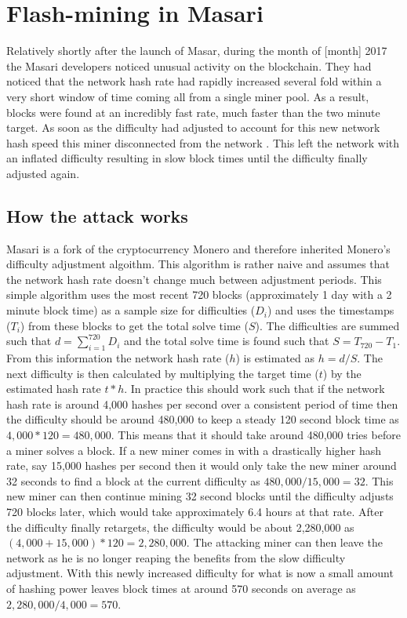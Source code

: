\documentclass{article}
\begin{document}
\section{Flash-mining in Masari}
Relatively shortly after the launch of Masar, during the month of [month] 2017 the Masari developers noticed unusual activity on the blockchain. They had noticed that the network hash rate had rapidly increased several fold within a very short window of time coming all from a single miner pool. As a result, blocks were found at an incredibly fast rate, much faster than the two minute target. As soon as the difficulty had adjusted to account for this new network hash speed this miner disconnected from the network . This left the network with an inflated difficulty resulting in slow block times until the difficulty finally adjusted again.

\subsection{How the attack works}
Masari is a fork of the cryptocurrency Monero and therefore inherited Monero's difficulty adjustment algoithm. This algorithm is rather naive and assumes that the network hash rate doesn't change much between adjustment periods. This simple algorithm uses the most recent 720 blocks (approximately 1 day with a 2 minute block time) as a sample size for difficulties ($D_i$) and uses the timestamps ($T_i$) from these blocks to get the total solve time ($S$). The difficulties are summed such that $d = \sum_{i=1}^{720} D_{i}$ and the total solve time is found such that $S = T_{720} - T_1$. From this information the network hash rate ($h$) is estimated as $h = d / S$. The next difficulty is then calculated by multiplying the target time ($t$) by the estimated hash rate $t * h$. In practice this should work such that if the network hash rate is around 4,000 hashes per second over a consistent period of time then the difficulty should be around 480,000 to keep a steady 120 second block time as $4,000 * 120 = 480,000$. This means that it should take around 480,000 tries before a miner solves a block. If a new miner comes in with a drastically higher hash rate, say 15,000 hashes per second then it would only take the new miner around 32 seconds to find a block at the current difficulty as $480,000 / 15,000 = 32$. This new miner can then continue mining 32 second blocks until the difficulty adjusts 720 blocks later, which would take approximately 6.4 hours at that rate. After the difficulty finally retargets, the difficulty would be about 2,280,000 as $(4,000 + 15,000) * 120 = 2,280,000$. The attacking miner can then leave the network as he is no longer reaping the benefits from the slow difficulty adjustment. With this newly increased difficulty for what is now a small amount of hashing power leaves block times at around 570 seconds on average as $2,280,000 / 4,000 = 570$.
\end{document}
